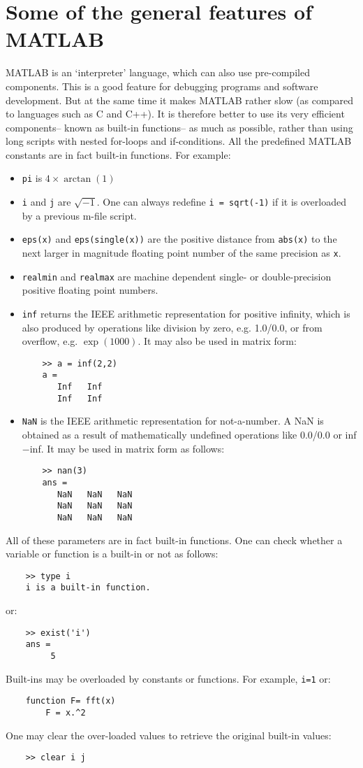 \documentclass[10pt,a4paper]{article}
\newcounter{example}[section]
\begin{document}
\section{Some of the general features of MATLAB}
\label{sec:features}
MATLAB is an `interpreter' language, which can also use pre-compiled components. This is a good feature for debugging programs and software development. But at the same time it makes MATLAB rather slow (as compared to languages such as C and C++). It is therefore better to use its very efficient components-- known as built-in functions-- as much as possible, rather than using long scripts with nested for-loops and if-conditions. All the predefined MATLAB constants are in fact built-in functions. For example:
\begin{itemize}
\item \texttt{pi} is $4\times\arctan(1)$
\item \texttt{i} and \texttt{j} are $\sqrt{-1}$. One can always redefine \texttt{i = sqrt(-1)} if it is overloaded by a previous m-file script.
\item \texttt{eps(x)} and \texttt{eps(single(x))} are the positive distance from \texttt{abs(x)} to the next larger in magnitude floating point number of the same precision as \texttt{x}.
\item \texttt{realmin} and \texttt{realmax} are machine dependent single- or double-precision positive floating point numbers.
\item \texttt{inf} returns the IEEE arithmetic representation for positive infinity, which is also produced by operations like division by zero, e.g. 1.0/0.0, or from overflow, e.g. $\exp(1000)$. It may also be used in matrix form: \begin{lstlisting}
	>> a = inf(2,2)
	a =
	   Inf   Inf
	   Inf   Inf
\end{lstlisting}
\item \texttt{NaN} is the IEEE arithmetic representation for not-a-number. A NaN is obtained as a result of mathematically undefined operations like 0.0/0.0  or inf$-$inf. It may be used in matrix form as follows:
\begin{lstlisting}
	>> nan(3)
	ans =
	   NaN   NaN   NaN
	   NaN   NaN   NaN
	   NaN   NaN   NaN
\end{lstlisting}
\end{itemize}
All of these parameters are in fact built-in functions. One can check whether a variable or function is a built-in or not as follows:
\begin{lstlisting}
	>> type i
	i is a built-in function.
\end{lstlisting}
or:
\begin{lstlisting}
	>> exist('i')
	ans =
	     5
\end{lstlisting}
Built-ins may be overloaded by constants or functions. For example, \texttt{i=1} or:
\begin{lstlisting}
	function F= fft(x)
	    F = x.^2
\end{lstlisting}
One may clear the over-loaded values to retrieve the original built-in values:
\begin{lstlisting}
	>> clear i j
\end{lstlisting}
\end{document}
